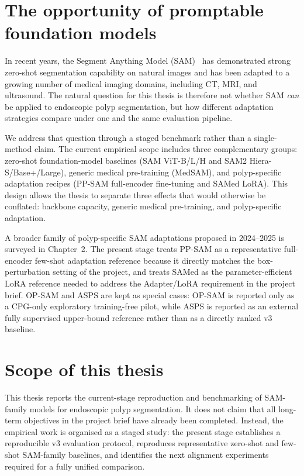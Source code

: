 \section{The opportunity of promptable foundation models}
\label{sec:sam}

In recent years, the Segment Anything Model (SAM)~\cite{kirillov2023sam} has demonstrated strong zero-shot segmentation capability on natural images and has been adapted to a growing number of medical imaging domains, including CT, MRI, and ultrasound. The natural question for this thesis is therefore not whether SAM \emph{can} be applied to endoscopic polyp segmentation, but how different adaptation strategies compare under one and the same evaluation pipeline.

We address that question through a staged benchmark rather than a single-method claim. The current empirical scope includes three complementary groups: zero-shot foundation-model baselines (SAM ViT-B/L/H and SAM2 Hiera-S/Base+/Large), generic medical pre-training (MedSAM), and polyp-specific adaptation recipes (PP-SAM full-encoder fine-tuning and SAMed LoRA). This design allows the thesis to separate three effects that would otherwise be conflated: backbone capacity, generic medical pre-training, and polyp-specific adaptation.

A broader family of polyp-specific SAM adaptations proposed in 2024--2025 is surveyed in Chapter~2. The present stage treats PP-SAM as a representative full-encoder few-shot adaptation reference because it directly matches the box-perturbation setting of the project, and treats SAMed as the parameter-efficient LoRA reference needed to address the Adapter/LoRA requirement in the project brief. OP-SAM and ASPS are kept as special cases: OP-SAM is reported only as a CPG-only exploratory training-free pilot, while ASPS is reported as an external fully supervised upper-bound reference rather than as a directly ranked v3 baseline.


\section{Scope of this thesis}
\label{sec:scope}

This thesis reports the current-stage reproduction and benchmarking of SAM-family models for endoscopic polyp segmentation. It does not claim that all long-term objectives in the project brief have already been completed. Instead, the empirical work is organised as a staged study: the present stage establishes a reproducible v3 evaluation protocol, reproduces representative zero-shot and few-shot SAM-family baselines, and identifies the next alignment experiments required for a fully unified comparison.

